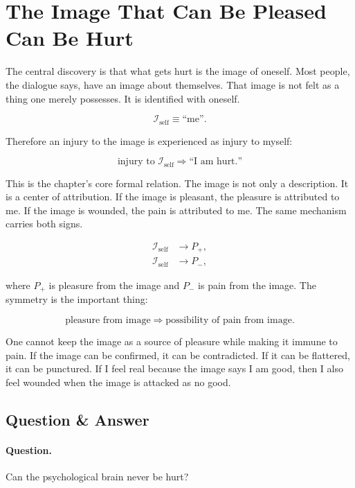 \section{The Image That Can Be Pleased Can Be Hurt}

The central discovery is that what gets hurt is the image of oneself. Most people, the dialogue says, have an image about themselves. That image is not felt as a thing one merely possesses. It is identified with oneself.

\begin{equation}
\mathcal{I}_{\text{self}} \equiv \text{``me''}.
\end{equation}

Therefore an injury to the image is experienced as injury to myself:

\begin{equation}
\text{injury to }\mathcal{I}_{\text{self}}
\Rightarrow
\text{``I am hurt.''}
\end{equation}

This is the chapter's core formal relation. The image is not only a description. It is a center of attribution. If the image is pleasant, the pleasure is attributed to me. If the image is wounded, the pain is attributed to me. The same mechanism carries both signs.

\begin{align}
\mathcal{I}_{\text{self}} &\to P_{+}, \\
\mathcal{I}_{\text{self}} &\to P_{-},
\end{align}

where \(P_{+}\) is pleasure from the image and \(P_{-}\) is pain from the image. The symmetry is the important thing:

\begin{equation}
\text{pleasure from image}
\Rightarrow
\text{possibility of pain from image}.
\end{equation}

One cannot keep the image as a source of pleasure while making it immune to pain. If the image can be confirmed, it can be contradicted. If it can be flattered, it can be punctured. If I feel real because the image says I am good, then I also feel wounded when the image is attacked as no good.

\subsection{Question \& Answer}

\paragraph{Question.}
Can the psychological brain never be hurt?

